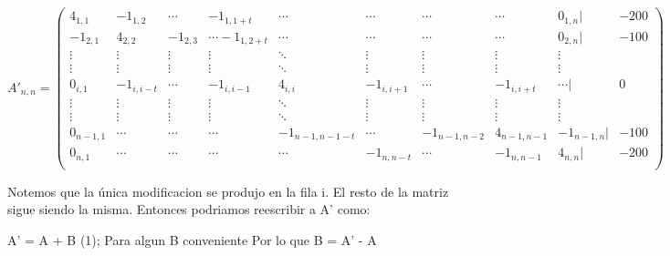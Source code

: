 \begin{itemize}
$$
A'_{n,n} =
 \begin{pmatrix}
  4_{1,1} & -1_{1,2} & \cdots & -1_{1,1+t} & \cdots & \cdots & \cdots & \cdots  & 0_{1,n} | & -200 \\
   -1_{2,1} & 4_{2,2} & -1_{2,3} & \cdots -1_{1,2+t} & \cdots & \cdots & \cdots & \cdots & 0_{2,n} | & -100 \\
  \vdots  & \vdots  & \vdots & \vdots  & \ddots & \vdots  & \vdots & \vdots & \vdots\\
  \vdots  & \vdots & \vdots & \vdots  & \ddots & \vdots  & \vdots & \vdots & \vdots\\
   0_{i,1} & -1_{i,i-t} & \cdots & -1_{i,i-1} & 4_{i,i} &  -1_{i,i+1} & \cdots & -1_{i,i+t} & \cdots | & 0 \\
  \vdots  & \vdots  & \vdots & \vdots  & \ddots  & \vdots  & \vdots & \vdots & \vdots\\
  \vdots  & \vdots  & \vdots & \vdots  & \ddots  & \vdots  & \vdots & \vdots & \vdots\\
   0_{n-1,1} & \cdots & \cdots & \cdots & -1_{n-1,n-1-t} & \cdots & -1_{n-1,n-2} & 4_{n-1,n-1} &  -1_{n-1,n} | & -100 \\
   0_{n,1} & \cdots & \cdots & \cdots & \cdots & -1_{n,n-t} & \cdots & -1_{n,n-1} &  4_{n,n} | & -200 \\
 \end{pmatrix}
$$


Notemos que la única modificacion se produjo en la fila i. El resto de la matriz sigue siendo la misma. Entonces podriamos reescribir a A' como:

A' = A + B (1);\newline
Para algun B conveniente\newline
Por lo que 
B = A' - A \newline


\end{itemize}
